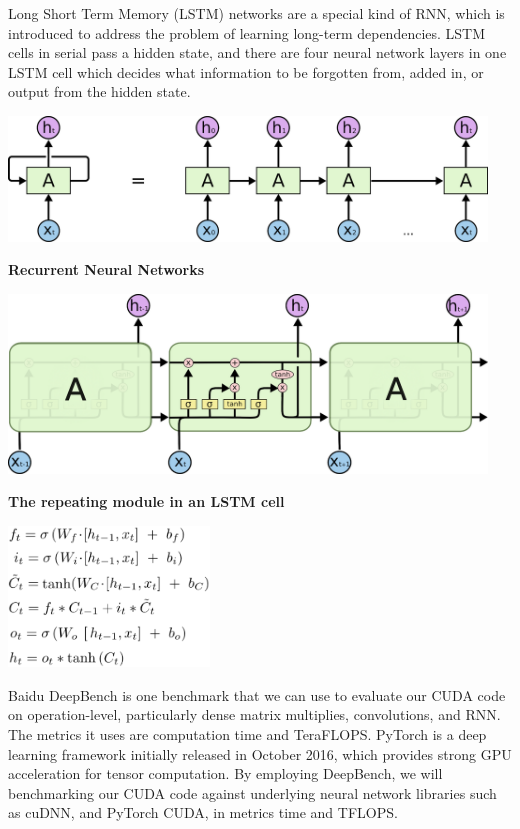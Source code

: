 \documentclass{article}
\begin{document}
Long Short Term Memory (LSTM) networks are a special kind of RNN, which is introduced to address the problem of learning long-term dependencies. LSTM cells in serial pass a hidden state, and there are four neural network layers in one LSTM cell which decides what information to be forgotten from, added in, or output from the hidden state.
\vspace{10pt}

\centerline{\includegraphics[width=5in]{rnn.png}}
\centerline{\textbf{Recurrent Neural Networks}}
\vspace{10pt}

\centerline{\includegraphics[width=5in]{lstm.png}}
\centerline{\textbf{The repeating module in an LSTM cell}}
\vspace{10pt}

\centerline{\includegraphics[width=2.1in]{lstm_formulas.png}}

Baidu DeepBench\cite{DeepBench} is one benchmark that we can use to evaluate our CUDA code on operation-level, particularly dense matrix multiplies, convolutions, and RNN. The metrics it uses are computation time and TeraFLOPS. 
PyTorch\cite{PyTorch} is a deep learning framework initially released in October 2016, which provides strong GPU acceleration for tensor computation. 
By employing DeepBench, we will benchmarking our CUDA code against underlying neural network libraries such as cuDNN, and PyTorch CUDA, in metrics time and TFLOPS.
\end{document}
